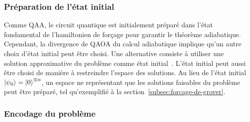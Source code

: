 
\subsubsection{Préparation de l'état initial}
\label{subsec:preparation-de-etat-initial}

Comme QAA, le circuit quantique est initialement préparé dans l'état fondamental de l'hamiltonien de forçage pour garantir le théorème adiabatique. Cependant, la divergence de QAOA du calcul adiabatique implique qu'un autre choix d'état initial peut être choisi. Une alternative consiste à utiliser une solution approximative du problème comme état initial~\cite{eggerWarmstartingQuantumOptimization2021}. L'état initial peut aussi être choisi de manière à restreindre l'espace des solutions. Au lieu de l'état initial $\ket{\psi_{0}} = \ket{0}^{\otimes n}$, un espace ne représentant que les solutions faisables du problème peut être préparé, tel qu'exemplifié à la section~\ref{subsec:forcage-de-grover}.


\subsubsection{Encodage du problème}
\label{subsec:encodage-probleme}

